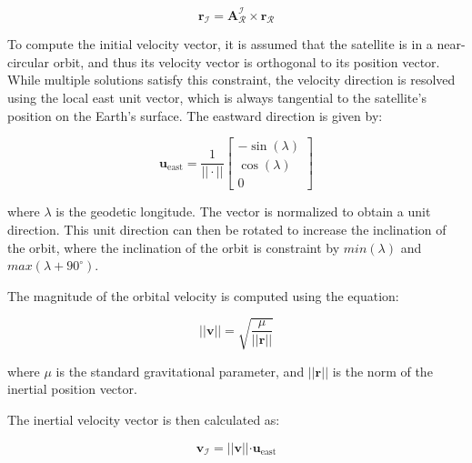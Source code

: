 \begin{equation}
    \mathbf{r}_\mathcal{I} = \mathbf{A}_\mathcal{R}^\mathcal{I} \times \mathbf{r}_\mathcal{R}
\end{equation}



\noindent
To compute the initial velocity vector, it is assumed that the satellite is in a near-circular orbit, and thus its velocity vector is orthogonal to its position vector. 
While multiple solutions satisfy this constraint, the velocity direction is resolved using the local east unit vector, which is always tangential to the satellite's 
position on the Earth's surface. The eastward direction is given by:

\begin{equation}
    \mathbf{u}_{\text{east}} = \frac{1}{|| \cdot ||} \begin{bmatrix}
        -\sin(\lambda) \\
        \cos(\lambda) \\
        0
    \end{bmatrix}
\end{equation}

\noindent
where $\lambda$ is the geodetic longitude. The vector is normalized to obtain a unit direction. This unit direction can then be rotated to increase the inclination of the orbit, where
the inclination of the orbit is constraint by $min(\lambda)$ and $max(\lambda + 90^\circ)$.
\vspace{0.5cm}

\noindent
The magnitude of the orbital velocity is computed using the equation:

\begin{equation}
    \left|| \mathbf{v} \right|| = \sqrt{\frac{\mu}{\left|| \mathbf{r} \right||}}
\end{equation}

\noindent
where $\mu$ is the standard gravitational parameter, and $|| \mathbf{r} ||$ is the norm of the inertial position vector.
\vspace{0.5cm}

\noindent
The inertial velocity vector is then calculated as:

\begin{equation}
    \mathbf{v}_\mathcal{I} = \left|| \mathbf{v} \right|| \cdot \mathbf{u}_{\text{east}}
\end{equation}

